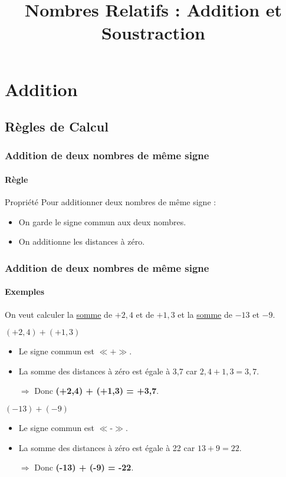 \documentclass{beamer}
\title{Nombres Relatifs : Addition et Soustraction}
\author{}\institute{}
\begin{document}
	
	
	
\begin{frame}
	\titlepage
\end{frame}

\section{Addition}

\subsection{Règles de Calcul}


\begin{frame}
\frametitle{Addition de deux nombres de même signe}  
\framesubtitle{Règle}	
	
\begin{block}{Propriété}
	Pour additionner deux nombres de même signe :
	\begin{itemize}
		\item On garde le signe commun aux deux nombres.
		\item On additionne les distances à zéro.
	\end{itemize}
\end{block}	

\end{frame}

\begin{frame}
	\frametitle{Addition de deux nombres de même signe}  
	\framesubtitle{Exemples}	
	
	On veut calculer la \underline{somme} de $ +2,4 $ et de $ +1,3 $ et la \underline{somme} de $ -13 $ et $ -9 $.\pause
	
	\begin{exampleblock}{$ (+2,4) + (+1,3) $}
		\begin{itemize} %
			\item Le signe commun est $ \ll \textbf{+} \gg $. %
			\item La somme des distances à zéro est égale à 3,7 
			car $ 2,4 + 1,3 = 3,7 $. %
			\item[$\Rightarrow$] Donc \textbf{(+2,4) + (+1,3) = +3,7}.\pause
		\end{itemize}
	\end{exampleblock}
	
	\begin{exampleblock}{$ (-13) + (-9) $}
		\begin{itemize}
			\item Le signe commun est $ \ll \textbf{-} \gg $.
			\item La somme des distances à zéro est égale à 22 
			car $ 13 + 9 = 22 $.
			\item[$\Rightarrow$] Donc \textbf{(-13) + (-9) = -22}.
		\end{itemize}
	\end{exampleblock}
\end{frame}
\end{document}
